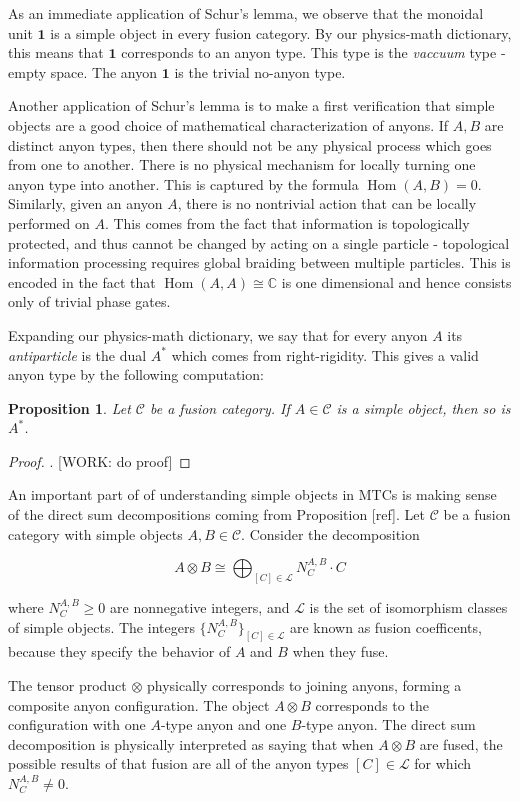 \documentclass{article}
\newtheorem{proposition}{Proposition}[section]
\theoremstyle{definition}
\DeclareMathOperator{\Hom}{Hom}
\newcommand{\CC}{\mathbb{C}}
\newcommand{\C}{\mathscr{C}}
\newcommand{\LL}{\mathcal{L}}
\newcommand{\0}{\left|0\right>}
\newcommand{\1}{\left|1\right>}
\newcommand{\one}{\mathbf{1}}
\numberwithin{figure}{section}
\begin{document}
As an immediate application of Schur's lemma, we observe that the monoidal unit $\one$ is a simple object in every fusion category. By our physics-math dictionary, this means that $\one$ corresponds to an anyon type. This type is the \textit{vaccuum} type - empty space. The anyon $\one$ is the trivial no-anyon type.

Another application of Schur's lemma is to make a first verification that simple objects are a good choice of mathematical characterization of anyons. If $A,B$ are distinct anyon types, then there should not be any physical process which goes from one to another. There is no physical mechanism for locally turning one anyon type into another. This is captured by the formula $\Hom(A,B)=0$. Similarly, given an anyon $A$, there is no nontrivial action that can be locally performed on $A$. This comes from the fact that information is topologically protected, and thus cannot be changed by acting on a single particle - topological information processing requires global braiding between multiple particles. This is encoded in the fact that $\Hom(A,A)\cong \CC$ is one dimensional and hence consists only of trivial phase gates.

Expanding our physics-math dictionary, we say that for every anyon $A$ its \textit{antiparticle} is the dual $A^*$ which comes from right-rigidity. This gives a valid anyon type by the following computation:

\begin{proposition} Let $\C$ be a fusion category. If $A\in \C$ is a simple object, then so is $A^*$.
\end{proposition}
\begin{proof}. [WORK: do proof]
\end{proof}

An important part of of understanding simple objects in MTCs is making sense of the direct sum decompositions coming from Proposition [ref]. Let $\C$ be a fusion category with simple objects $A,B\in \C$. Consider the decomposition

$$A\otimes B \cong \bigoplus_{[C]\in \LL}N^{A,B}_{C}\cdot C$$

where $N^{A,B}_{C}\geq 0$ are nonnegative integers, and $\LL$ is the set of isomorphism classes of simple objects. The integers $\{N^{A,B}_C\}_{[C]\in \LL}$ are known as fusion coefficents, because they specify the behavior of $A$ and $B$ when they fuse.

The tensor product $\otimes$ physically corresponds to joining anyons, forming a composite anyon configuration. The object $A\otimes B$ corresponds to the configuration with one $A$-type anyon and one $B$-type anyon. The direct sum decomposition is physically interpreted as saying that when $A\otimes B$ are fused, the possible results of that fusion are all of the anyon types $[C]\in \LL$ for which $N^{A,B}_{C}\neq 0$.
\end{document}
